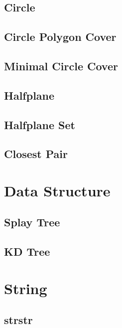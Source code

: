 \documentclass[10pt,twocolumn,oneside]{article}
\begin{document}
    \subsection{Circle}
    
    \subsection{Circle Polygon Cover}
    
    \subsection{Minimal Circle Cover}
    
    \subsection{Halfplane}
    
    \subsection{Halfplane Set}
    
    \subsection{Closest Pair}
    
    \newpage

    \section{Data Structure}
    \subsection{Splay Tree}
    
    \subsection{KD Tree}
    
    \newpage

    \section{String}
    \subsection{strstr}
    
\end{document}
